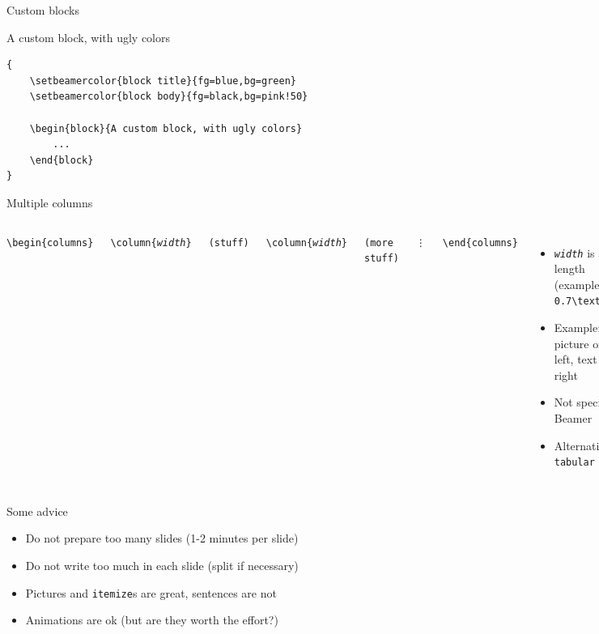 \documentclass[11pt]{beamer}
\newcommand{\bs}{\textbackslash}
\begin{document}
\begin{frame}[fragile]{Custom blocks}

  {
    \begin{block}{A custom block, with ugly colors}
      \begin{verbatim}
{
    \setbeamercolor{block title}{fg=blue,bg=green}
    \setbeamercolor{block body}{fg=black,bg=pink!50}
    
    \begin{block}{A custom block, with ugly colors}
        ...
    \end{block}
}
      \end{verbatim}
    \end{block}
  }
\end{frame}


\begin{frame}{Multiple columns}
  \begin{columns}
    \texttt{\bs begin\{columns\}}

    \texttt{\qquad\bs column\{\emph{width}\}}

    \texttt{\qquad(stuff)}

    \texttt{\qquad\bs column\{\emph{width}\}}

    \texttt{\qquad(more stuff)}

    \texttt{\qquad\qquad\vdots}

    \texttt{\bs end\{columns\}}
    \begin{itemize}
      \item \texttt{\emph{width}} is a length (example:
            \texttt{0.7\bs textwidth})
      \item Example: picture on the left, text on the right
      \item Not specific to Beamer
      \item Alternative: \texttt{tabular}
    \end{itemize}
  \end{columns}

\end{frame}

\begin{frame}{Some advice}
  \begin{itemize}
    \item Do not prepare too many slides (1-2 minutes per slide)
    \item Do not write too much in each slide (split if necessary)
    \item Pictures and \texttt{itemize}s are great, sentences are not
    \item Animations are ok (but are they worth the effort?)
  \end{itemize}
\end{frame}
\end{document}
